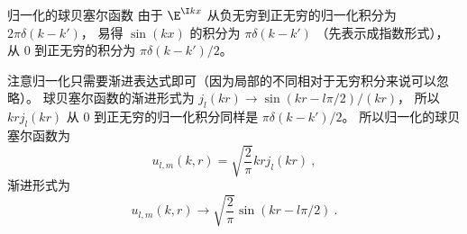 \begin{example}{归一化的球贝塞尔函数}
由于 $\E^{\I kx}$ 从负无穷到正无穷的归一化积分为 $2\pi\delta(k-k')$， 易得 $\sin(kx)$ 的积分为 $\pi\delta(k-k')$ （先表示成指数形式）， 从 0 到正无穷的积分为 $\pi\delta(k-k')/2$。

注意归一化只需要渐进表达式即可（因为局部的不同相对于无穷积分来说可以忽略）。 球贝塞尔函数的渐进形式为 $j_l(kr) \to \sin(kr - l\pi/2)/(kr)$， 所以 $kr j_l(kr)$ 从 0 到正无穷的归一化积分同样是 $\pi\delta(k-k')/2$。 所以归一化的球贝塞尔函数为
\begin{equation}
u_{l,m}(k, r) = \sqrt{\frac{2}{\pi}} kr j_l(kr)~,
\end{equation}
渐进形式为
\begin{equation}
u_{l,m}(k, r) \to  \sqrt{\frac{2}{\pi}} \sin(kr - l\pi/2)~.
\end{equation}
\end{example}
